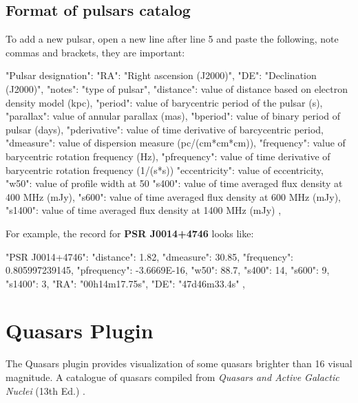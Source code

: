 \newpage
\subsection{Format of pulsars catalog}
\label{sec:plugins:Pulsars:format}

To add a new pulsar, open a new line after line 5 and paste the following, note commas and brackets, they are important:

\begin{configfile}
"Pulsar designation":
{
    "RA": "Right ascension (J2000)",
    "DE": "Declination (J2000)",
    "notes": "type of pulsar",
    "distance": value of distance based on electron density 
                model (kpc),
    "period": value of barycentric period of the pulsar (s),
    "parallax": value of annular parallax (mas),
    "bperiod": value of binary period of pulsar (days),
    "pderivative": value of time derivative of barcycentric 
                   period,
    "dmeasure": value of dispersion measure (pc/(cm*cm*cm)),
    "frequency": value of barycentric rotation frequency (Hz),
    "pfrequency": value of time derivative of barycentric 
                  rotation frequency (1/(s*s))
    "eccentricity": value of eccentricity,                   
    "w50": value of profile width at 50%
    "s400": value of time averaged flux density at 
            400 MHz (mJy),
    "s600": value of time averaged flux density at 
            600 MHz (mJy),
    "s1400": value of time averaged flux density at 
             1400 MHz (mJy)    
},
\end{configfile}

\noindent For example, the record for \textbf{PSR J0014+4746} looks like:
\begin{configfile}
"PSR J0014+4746":
{
    "distance": 1.82,
    "dmeasure": 30.85,
    "frequency": 0.805997239145,
    "pfrequency": -3.6669E-16,
    "w50": 88.7,
    "s400": 14,
    "s600": 9,
    "s1400": 3,
    "RA": "00h14m17.75s",
    "DE": "47d46m33.4s"
},
\end{configfile}

\newpage
\section{Quasars Plugin}
\label{sec:plugins:Quasars}

\noindent The Quasars plugin provides visualization of some quasars brighter than 16 visual magnitude. A catalogue of quasars compiled from \textit{Quasars and Active Galactic Nuclei} (13th Ed.) \cite{2010A&A...518A..10V}.

